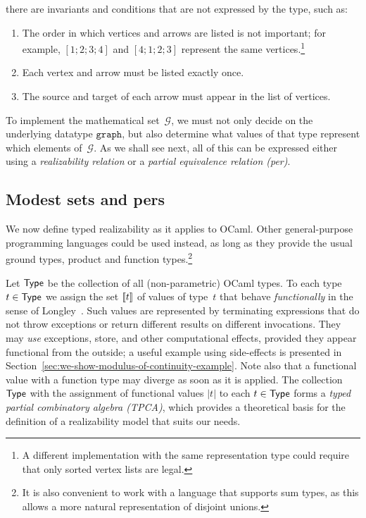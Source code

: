 there are invariants and conditions that are not expressed by the type, such as:
%
\begin{enumerate}
\item The order in which vertices and arrows are listed is not
  important; for example, $[1;2;3;4]$ and $[4;1;2;3]$ represent the same vertices.\footnote{
  A different implementation with the same representation type could require
  that only sorted vertex lists are legal.}
\item Each vertex and arrow must be listed exactly once.
\item The source and target of each arrow must appear in the list of vertices.
\end{enumerate}
%
To implement the mathematical set~$\mathcal{G}$, we must not
only decide on the underlying datatype $\mathtt{graph}$, but also
determine what values of that type represent which elements
of~$\mathcal{G}$.  As we shall see next, all of this can be expressed
either using a \emph{realizability relation} or a \emph{partial
  equivalence relation (per)}.

\subsection{Modest sets and pers}
\label{sec:modest-sets-pers}

We now define typed realizability as it
applies to OCaml. Other general-purpose programming languages could be
used instead, as long as they provide the usual ground types, product
and function types.\footnote{It is also convenient to work with a
language that supports sum types, as this allows a more natural
representation of disjoint unions.}

Let $\mathsf{Type}$ be the collection of all (non-parametric) OCaml types. To
each type $t \in \mathsf{Type}$ we assign the set $[\![t]\!]$ of values of
type~$t$ that behave \emph{functionally} in the sense
of Longley~\cite{longley99when}. Such values are represented by terminating
expressions that do not throw exceptions or return different results
on different invocations.  They may \emph{use} exceptions,
store, and other computational effects, provided they appear
functional from the outside; a useful example using side-effects is
presented in Section~\ref{sec:we-show-modulus-of-continuity-example}.
Note also that a functional value with a function type may diverge as
soon as it is applied.   The collection $\mathsf{Type}$ with the assignment of functional
values $|t|$ to each $t \in \mathsf{Type}$ forms a \emph{typed partial
  combinatory algebra (TPCA)}, which provides a theoretical basis for
the definition of a realizability model that suits our needs.

